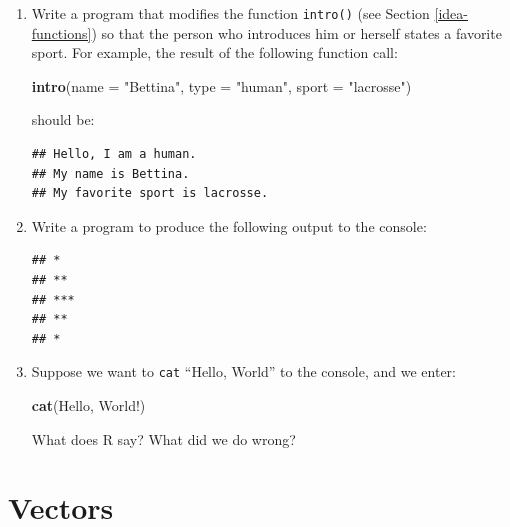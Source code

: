 \documentclass[]{book}
\makeatletter
\newenvironment{Shaded}{\begin{snugshade}}{\end{snugshade}}
\newcommand{\KeywordTok}[1]{\textcolor[rgb]{0.13,0.29,0.53}{\textbf{{#1}}}}
\newcommand{\DataTypeTok}[1]{\textcolor[rgb]{0.13,0.29,0.53}{{#1}}}
\newcommand{\StringTok}[1]{\textcolor[rgb]{0.31,0.60,0.02}{{#1}}}
\newcommand{\NormalTok}[1]{{#1}}
\newenvironment{kframe}{%
\medskip{}
\setlength{\fboxsep}{.8em}
 \def\at@end@of@kframe{}%
 \ifinner\ifhmode%
  \def\at@end@of@kframe{\end{minipage}}%
  \begin{minipage}{\columnwidth}%
 \fi\fi%
 \def\FrameCommand##1{\hskip\@totalleftmargin \hskip-\fboxsep
 \colorbox{shadecolor}{##1}\hskip-\fboxsep
     \hskip-\linewidth \hskip-\@totalleftmargin \hskip\columnwidth}%
 \MakeFramed {\advance\hsize-\width
   \@totalleftmargin\z@ \linewidth\hsize
   \@setminipage}}%
 {\par\unskip\endMakeFramed%
 \at@end@of@kframe}
\renewenvironment{Shaded}{\begin{kframe}}{\end{kframe}}
\theoremstyle{definition}
\theoremstyle{definition}
\theoremstyle{remark}
\makeatother
\begin{document}
\begin{enumerate}
\def\labelenumi{\arabic{enumi}.}
\item
  Write a program that modifies the function \texttt{intro()} (see
  Section \ref{idea-functions}) so that the person who introduces him or
  herself states a favorite sport. For example, the result of the
  following function call:

\begin{Shaded}
\begin{Highlighting}[]
\KeywordTok{intro}\NormalTok{(}\DataTypeTok{name =} \StringTok{"Bettina"}\NormalTok{, }\DataTypeTok{type =} \StringTok{"human"}\NormalTok{, }\DataTypeTok{sport =} \StringTok{"lacrosse"}\NormalTok{)}
\end{Highlighting}
\end{Shaded}

  should be:

\begin{verbatim}
## Hello, I am a human.  
## My name is Bettina.
## My favorite sport is lacrosse.
\end{verbatim}
\item
  Write a program to produce the following output to the console:

\begin{verbatim}
## *
## **
## ***
## **
## *
\end{verbatim}
\item
  Suppose we want to \texttt{cat} ``Hello, World'' to the console, and
  we enter:

\begin{Shaded}
\begin{Highlighting}[]
\KeywordTok{cat}\NormalTok{(Hello, World!)}
\end{Highlighting}
\end{Shaded}

  What does R say? What did we do wrong?
\end{enumerate}

\chapter{Vectors}\label{vectors}
\end{document}
